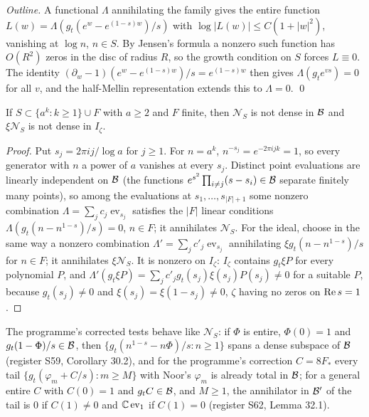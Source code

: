 \emph{Outline.} A functional $\Lambda$ annihilating the family gives the entire function $L(w)=\Lambda(g_t(e^w-e^{(1-s)w})/s)$ with $\log|L(w)|\le C(1+|w|^2)$, vanishing at $\log n$, $n\in S$. By Jensen's formula a nonzero such function has $O(R^2)$ zeros in the disc of radius $R$, so the growth condition on $S$ forces $L\equiv0$. The identity $(\partial_w-1)(e^w-e^{(1-s)w})/s=e^{(1-s)w}$ then gives $\Lambda(g_te^{vs})=0$ for all $v$, and the half-Mellin representation extends this to $\Lambda=0$. \qed

\begin{proposition}\label{prop:NBfail}
If $S\subset\{a^k:k\ge1\}\cup F$ with $a\ge2$ and $F$ finite, then $\mathcal{N}_S$ is not dense in $\mathcal{B}$ and $\xi\mathcal{N}_S$ is not dense in $I_\zeta$.
\end{proposition}

\begin{proof}
Put $s_j=2\pi ij/\log a$ for $j\ge1$. For $n=a^k$, $n^{-s_j}=e^{-2\pi ijk}=1$, so every generator with $n$ a power of $a$ vanishes at every $s_j$.
Distinct point evaluations are linearly independent on $\mathcal{B}$ (the functions $e^{s^2}\prod_{i\ne j}(s-s_i)\in\mathcal{B}$ separate finitely many points), so among the evaluations at $s_1,\dots,s_{|F|+1}$ some nonzero combination $\Lambda=\sum_jc_j\operatorname{ev}_{s_j}$ satisfies the $|F|$ linear conditions $\Lambda(g_t(n-n^{1-s})/s)=0$, $n\in F$; it annihilates $\mathcal{N}_S$.
For the ideal, choose in the same way a nonzero combination $\Lambda'=\sum_jc'_j\operatorname{ev}_{s_j}$ annihilating $\xi g_t(n-n^{1-s})/s$ for $n\in F$; it annihilates $\xi\mathcal{N}_S$. It is nonzero on $I_\zeta$: $I_\zeta$ contains $g_t\xi P$ for every polynomial $P$, and $\Lambda'(g_t\xi P)=\sum_jc'_jg_t(s_j)\xi(s_j)P(s_j)\ne0$ for a suitable $P$, because $g_t(s_j)\ne0$ and $\xi(s_j)=\xi(1-s_j)\ne0$, $\zeta$ having no zeros on $\operatorname{Re} s=1$.
\end{proof}

The programme's corrected tests behave like $\mathcal{N}_S$: if $\Phi$ is entire, $\Phi(0)=1$ and $g_t(1-\Phi)/s\in\mathcal{B}$, then $\{g_t(n^{1-s}-n\Phi)/s:n\ge1\}$ spans a dense subspace of $\mathcal{B}$ (register S59,  Corollary 30.2), and for the programme's correction $C=8F_*$ every tail $\{g_t(\varphi_m+C/s):m\ge M\}$ with Noor's $\varphi_m$ is already total in $\mathcal{B}$; for a general entire $C$ with $C(0)=1$ and $g_tC\in\mathcal{B}$, and $M\ge1$, the annihilator in $\mathcal{B}'$ of the tail is $0$ if $C(1)\ne0$ and $\mathbb{C}\operatorname{ev}_1$ if $C(1)=0$ (register S62,  Lemma 32.1).

